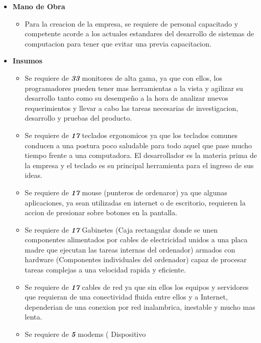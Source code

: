 \documentclass[
10pt, %
a4paper, %
oneside, %
headinclude,footinclude, %
BCOR5mm, %
]{scrartcl}
\begin{document}
\begin{itemize}
\pagebreak

  \item \textbf {Mano de Obra}
  \begin{itemize}
    \item Para la creacion de la empresa, se requiere de personal capacitado y
            competente acorde a los actuales estandares del desarrollo de sistemas
            de computacion para tener que evitar una previa capacitacion.
  \end{itemize}


  \item \textbf {Insumos}
  \begin{itemize}
    \item Se requiere de \emph { \textbf{33} } monitores de alta gama,
            ya que con ellos, los programadores pueden tener mas herramientas
            a la vista y agilizar su desarrollo tanto como su desempeño a la
            hora de analizar nuevos requerimientos y llevar a cabo las tareas
            necesarias de investigacion, desarrollo y pruebas del producto.
    \item Se requiere de \emph { \textbf{17} } teclados ergonomicos
            ya que los teclados comunes conducen a una postura poco saludable
            para todo aquel que pase mucho tiempo frente a una computadora.
            El desarrollador es la materia prima de la empresa y el teclado
            es su principal herramienta para el ingreso de sus ideas.
    \item Se requiere de \emph { \textbf{17} } mouse (punteros de ordenaror)
            ya que algunas aplicaciones, ya sean utilizadas en internet o de
            escritorio, requieren la accion de presionar sobre botones en la
            pantalla.
      \item Se requiere de \emph { \textbf{17} } Gabinetes (Caja rectangular
              donde se unen componentes alimentados por cables de electricidad
              unidos a una placa madre que ejecutan las tareas internas del
              ordenador) armados con hardware (Componentes individuales del
              ordenador) capaz de procesar tareas complejas a una velocidad
              rapida y eficiente.
    \item Se requiere de \emph { \textbf{17} } cables de red ya que sin ellos
            los equipos y servidores que requieran de una conectividad
            fluida entre ellos y a Internet, dependerian de una conexion por
            red inalambrica, inestable y mucho mas lenta.
    \item Se requiere de \emph { \textbf{5} } modems ( Dispositivo

\end{itemize}
\end{itemize}
\end{document}
